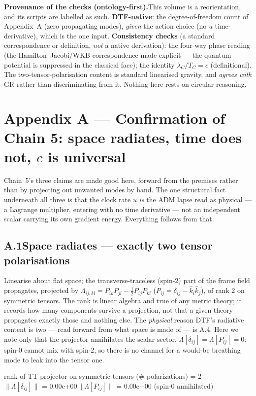 \documentclass[11pt]{article}
\begin{document}
\begin{tcolorbox}
\textbf{Provenance of the checks (ontology-first).}\enspace This volume is a reorientation, and its
scripts are labelled as such. \textbf{DTF-native}: the degree-of-freedom count of Appendix~A (zero
propagating modes), \emph{given} the action choice (no $u$ time-derivative), which is the one input.
\textbf{Consistency checks} (a standard correspondence or definition, \emph{not} a native derivation):
the four-way phase reading (the Hamilton--Jacobi/WKB correspondence made explicit --- the quantum
potential is suppressed in the classical face); the identity $\lambda_C/T_C=c$ (definitional). The
two-tensor-polarisation content is standard linearised gravity, and \emph{agrees with} GR rather than
discriminating from it. Nothing here rests on circular reasoning.
\end{tcolorbox}

\appendix
\section*{Appendix A --- Confirmation of Chain 5: space radiates, time does not, $c$ is universal}

\noindent Chain~5's three claims are made good here, forward from the premises rather than by projecting
out unwanted modes by hand. The one structural fact underneath all three is that the clock rate $u$
\emph{is} the ADM lapse read as physical --- a Lagrange multiplier, entering with no time derivative --- not
an independent scalar carrying its own gradient energy. Everything follows from that.

\subsection*{A.1\quad Space radiates --- exactly two tensor polarisations}
Linearise about flat space; the transverse-traceless (spin-2) part of the frame field propagates, projected
by $\Lambda_{ij,kl}=P_{ik}P_{jl}-\tfrac12P_{ij}P_{kl}$ ($P_{ij}=\delta_{ij}-\hat k_i\hat k_j$), of rank $2$
on symmetric tensors. The rank is linear algebra and true of any metric theory; it records how many
components survive a projection, not that a given theory propagates exactly those and nothing else. The
\emph{physical} reason DTF's radiative content is two --- read forward from what space is made of --- is
A.4. Here we note only that the projector annihilates the scalar sector, $\Lambda[\delta_{ij}]=\Lambda[P_{ij}]=0$:
spin-0 cannot mix with spin-2, so there is no channel for a would-be breathing mode to leak into the tensor one.
\begin{tcolorbox}[colback=cbPyBg,colframe=cbNodeFr,boxrule=0.5pt,arc=2pt,left=8pt,right=8pt,top=4pt,bottom=4pt]
\ttfamily\small rank of TT projector on symmetric tensors (\# polarizations) = 2\\
$\|\Lambda[\delta_{ij}]\|$ = 0.00e+00\qquad$\|\Lambda[P_{ij}]\|$ = 0.00e+00  (spin-0 annihilated)
\end{tcolorbox}
\end{document}
